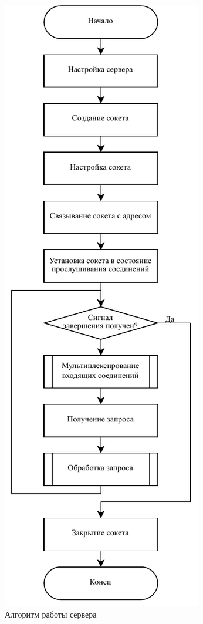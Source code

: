 \begin{figure}[hbtp]
	\centering
	\includegraphics[scale=1.2]{img/server.pdf}
	\caption{Алгоритм работы сервера}
	\label{fig:server}
\end{figure}


